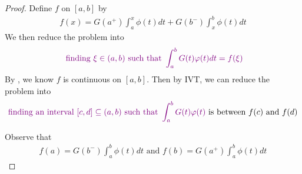 \documentclass{report}
\begin{document}
\begin{proof}
Define $f$ on  $[a,b]$ by 
\begin{align*}
f(x)=G(a^+)\int_a^x \phi(t)dt+G(b^-)\int_x^b \phi(t)dt
\end{align*}
We then reduce the problem into 
\begin{align*}
\textcolor{violet}{\text{ finding }\xi \in (a,b)\text{ such that }\int_a^b G(t)\varphi (t)dt=f(\xi)}
\end{align*}
By , we know $f$ is continuous on  $[a,b]$. Then by IVT, we can reduce the problem into 
\begin{align*}
\textcolor{violet}{\text{ finding an interval $[c,d]\subseteq (a,b)$ such that }\int_a^b G(t)\varphi (t)}\text{ is between $f(c) $ and $f(d)$ }
\end{align*}


Observe that 
\begin{align*}
f(a)=G(b^-)\int_a^b \phi(t)dt\text{ and }f(b)=G(a^+)\int_a^b \phi(t)dt 
\end{align*}
\end{proof} 
\end{document}
